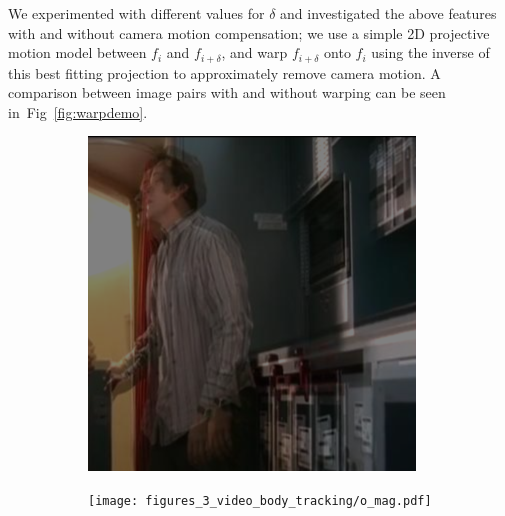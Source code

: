 We experimented with different values for $\delta$ and investigated the above features with and without camera motion compensation; we use a simple 2D projective motion model between $f_{i}$ and $f_{i+\delta}$, and warp $f_{i+\delta}$ onto $f_i$ using the inverse of this best fitting projection to approximately remove camera motion. A comparison between image pairs with and without warping can be seen in~Fig~\ref{fig:warpdemo}.
\begin{figure}[ht]
        \centering
        \begin{subfigure}{0.23\textwidth}
                \centering
                \includegraphics[width=\textwidth]{figures_3_video_body_tracking/o.png}
                \caption{\footnotesize }
                \label{fig:nonw_avg}
        \end{subfigure}
        \begin{subfigure}{0.268\textwidth}
                \centering
                \texttt{[image: figures\_3\_video\_body\_tracking/o\_mag.pdf]}
                \caption{\footnotesize }
                \label{fig:nonw_flow}
        \end{subfigure}
        \begin{subfigure}{0.23\textwidth}
                \centering

\end{subfigure}
\end{figure}
